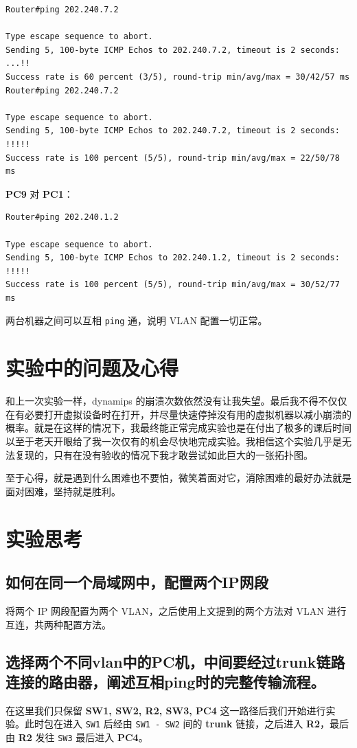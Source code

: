 \documentclass[black,normal,cn]{elegantnote}
\begin{document}
\begin{lstlisting}
Router#ping 202.240.7.2

Type escape sequence to abort.
Sending 5, 100-byte ICMP Echos to 202.240.7.2, timeout is 2 seconds:
...!!
Success rate is 60 percent (3/5), round-trip min/avg/max = 30/42/57 ms
Router#ping 202.240.7.2

Type escape sequence to abort.
Sending 5, 100-byte ICMP Echos to 202.240.7.2, timeout is 2 seconds:
!!!!!
Success rate is 100 percent (5/5), round-trip min/avg/max = 22/50/78 ms
\end{lstlisting}

\textbf{PC9} 对 \textbf{PC1}：
\begin{lstlisting}
Router#ping 202.240.1.2

Type escape sequence to abort.
Sending 5, 100-byte ICMP Echos to 202.240.1.2, timeout is 2 seconds:
!!!!!
Success rate is 100 percent (5/5), round-trip min/avg/max = 30/52/77 ms
\end{lstlisting}

两台机器之间可以互相 \texttt{ping} 通，说明 VLAN 配置一切正常。

\section{实验中的问题及心得}

和上一次实验一样，dynamips 的崩溃次数依然没有让我失望。最后我不得不仅仅在有必要打开虚拟设备时在打开，并尽量快速停掉没有用的虚拟机器以减小崩溃的概率。就是在这样的情况下，我最终能正常完成实验也是在付出了极多的课后时间以至于老天开眼给了我一次仅有的机会尽快地完成实验。我相信这个实验几乎是无法复现的，只有在没有验收的情况下我才敢尝试如此巨大的一张拓扑图。

至于心得，就是遇到什么困难也不要怕，微笑着面对它，消除困难的最好办法就是面对困难，坚持就是胜利。

\section{实验思考}
\subsection{如何在同一个局域网中，配置两个IP网段}
将两个 IP 网段配置为两个 VLAN，之后使用上文提到的两个方法对 VLAN 进行互连，共两种配置方法。

\subsection{选择两个不同vlan中的PC机，中间要经过trunk链路连接的路由器，阐述互相ping时的完整传输流程。}
在这里我们只保留 \textbf{SW1, SW2, R2, SW3, PC4} 这一路径后我们开始进行实验。此时包在进入 \texttt{SW1} 后经由 \texttt{SW1 - SW2} 间的 \textbf{trunk} 链接，之后进入 \textbf{R2}，最后由 \textbf{R2} 发往 \texttt{SW3} 最后进入 \textbf{PC4}。
\end{document}

